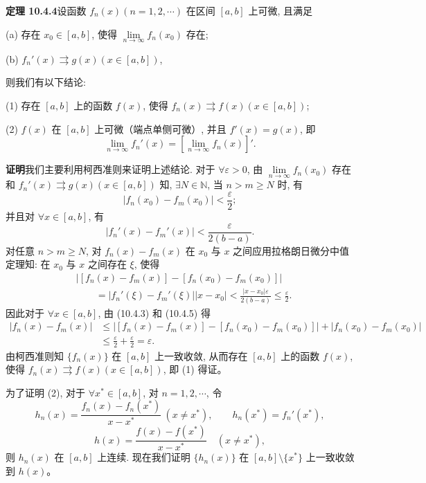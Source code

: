 \documentclass[UTF8, 12pt, fontset=fandol, oneside]{ctexart}
\begin{document}
\noindent\textbf{定理 10.4.4}\quad 设函数 $f_n(x)(n=1,2,\cdots)$ 在区间 $[a,b]$ 上可微, 且满足

(a) 存在 $x_0\in[a,b]$, 使得 $\lim\limits_{n\to\infty}f_n(x_0)$ 存在;

(b) $f_n'(x)\rightrightarrows g(x)(x\in[a,b])$,

则我们有以下结论:

(1) 存在 $[a,b]$ 上的函数 $f(x)$, 使得 $f_n(x)\rightrightarrows f(x)(x\in[a,b])$;

(2) $f(x)$ 在 $[a,b]$ 上可微（端点单侧可微）, 并且 $f'(x)=g(x)$, 即
\[
  \lim_{n\to\infty}f_n'(x)=\left[\lim_{n\to\infty}f_n(x)\right]'.
\]

\noindent\textbf{证明}\quad 我们主要利用柯西准则来证明上述结论. 对于 $\forall\varepsilon>0$, 由 $\lim\limits_{n\to\infty}f_n(x_0)$ 存在和 $f_n'(x)\rightrightarrows g(x)(x\in[a,b])$ 知, $\exists N\in\mathbb N$, 当 $n>m\geq N$ 时, 有
\begin{equation}
  |f_n(x_0)-f_m(x_0)|<\frac\varepsilon2;
  \tag{10.4.3}
\end{equation}
并且对 $\forall x\in[a,b]$, 有
\begin{equation}
  |f_n'(x)-f_m'(x)|<\frac{\varepsilon}{2(b-a)}.
  \tag{10.4.4}
\end{equation}
对任意 $n>m\geq N$, 对 $f_n(x)-f_m(x)$ 在 $x_0$ 与 $x$ 之间应用拉格朗日微分中值定理知: 在 $x_0$ 与 $x$ 之间存在 $\xi$, 使得
\begin{equation}
\begin{aligned}
  &\left|[f_n(x)-f_m(x)]-[f_n(x_0)-f_m(x_0)]\right|\\
  &\qquad =|f_n'(\xi)-f_m'(\xi)||x-x_0|
   <\frac{|x-x_0|\varepsilon}{2(b-a)}\leq\frac\varepsilon2.
\end{aligned}
  \tag{10.4.5}
\end{equation}
因此对于 $\forall x\in[a,b]$, 由 (10.4.3) 和 (10.4.5) 得
\[
\begin{aligned}
  |f_n(x)-f_m(x)|
  &\leq \left|[f_n(x)-f_m(x)]-[f_n(x_0)-f_m(x_0)]\right|
      +|f_n(x_0)-f_m(x_0)|\\
  &\leq\frac\varepsilon2+\frac\varepsilon2=\varepsilon.
\end{aligned}
\]
由柯西准则知 $\{f_n(x)\}$ 在 $[a,b]$ 上一致收敛, 从而存在 $[a,b]$ 上的函数 $f(x)$, 使得 $f_n(x)\rightrightarrows f(x)(x\in[a,b])$, 即 (1) 得证。

为了证明 (2), 对于 $\forall x^*\in[a,b]$, 对 $n=1,2,\cdots$, 令
\[
  h_n(x)=\frac{f_n(x)-f_n(x^*)}{x-x^*}\ (x\ne x^*),\qquad h_n(x^*)=f_n'(x^*),
\]
\[
  h(x)=\frac{f(x)-f(x^*)}{x-x^*}\quad (x\ne x^*),
\]
则 $h_n(x)$ 在 $[a,b]$ 上连续. 现在我们证明 $\{h_n(x)\}$ 在 $[a,b]\setminus\{x^*\}$ 上一致收敛到 $h(x)$。
\end{document}
